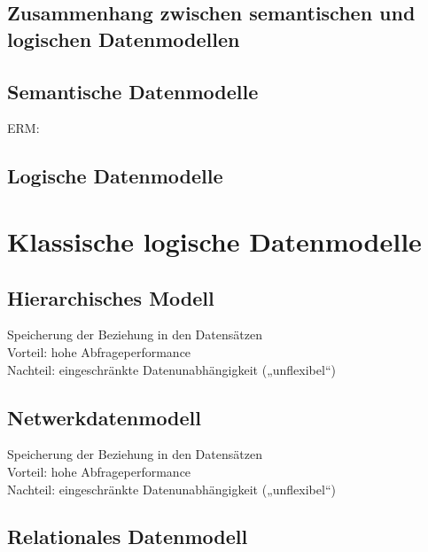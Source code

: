\subsection{Zusammenhang zwischen semantischen und logischen Datenmodellen}
\subsection{Semantische Datenmodelle}
ERM:\\
\subsection{Logische Datenmodelle}
\section{Klassische logische Datenmodelle}
\subsection{Hierarchisches Modell}
Speicherung der Beziehung in den Datensätzen\\
Vorteil: hohe Abfrageperformance\\
Nachteil: eingeschränkte Datenunabhängigkeit („unflexibel“)
\subsection{Netwerkdatenmodell}
Speicherung der Beziehung in den Datensätzen\\
Vorteil: hohe Abfrageperformance\\
Nachteil: eingeschränkte Datenunabhängigkeit („unflexibel“)
\subsection{Relationales Datenmodell}
